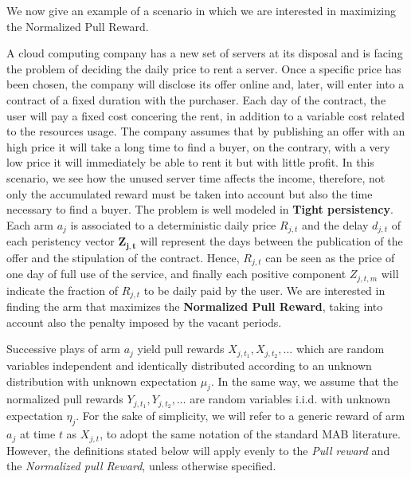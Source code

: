We now give an example of a scenario in which we are interested in maximizing the Normalized Pull Reward.
\begin{example}
\label{cloud}
A cloud computing company has a new set of servers at its disposal and is facing the problem of deciding the daily price to rent a server. Once a specific price has been chosen, the company will disclose its offer online and, later, will enter into a contract of a fixed duration with the purchaser. Each day of the contract, the user will pay a fixed cost concering the rent, in addition to a variable cost related to the resources usage. The company assumes that by publishing an offer with an high price it will take a long time to find a buyer, on the contrary, with a very low price it will immediately be able to rent it but with little profit. In this scenario, we see how the unused server time affects the income, therefore, not only the accumulated reward must be taken into account but also the time necessary to find a buyer. The problem is well modeled in 	\textbf{Tight persistency}. Each arm $a_j$ is associated to a deterministic daily price $R_{j,t}$ and the delay $d_{j,t}$ of each peristency vector $\boldsymbol{Z_{j,t}}$ will represent the days between the publication of the offer and the stipulation of the contract. Hence, $R_{j,t}$ can be seen as the price of one day of full use of the service, and finally each positive component $Z_{j,t,m}$ will indicate the fraction of $R_{j,t}$ to be daily paid by the user. We are interested in finding the arm that maximizes the \textbf{Normalized Pull Reward}, taking into account also the penalty imposed by the vacant periods.

\end{example}

Successive plays of arm $a_j$ yield pull rewards $X_{j,t_1}, X_{j,t_2},\dots$ which are random variables independent and identically distributed according to an unknown distribution with unknown expectation $\mu_j$.
In the same way, we assume that the normalized pull rewards $Y_{j,t_1}, Y_{j,t_2}, \dots$ are random variables i.i.d. with unknown expectation $\eta_j$. For the sake of simplicity, we will refer to a generic reward of arm $a_j$ at time $t$ as  $X_{j,t}$, to adopt the same notation of the standard MAB literature. However, the definitions stated below will apply evenly to the \emph{Pull reward} and the \emph{Normalized pull Reward}, unless otherwise specified.\\

